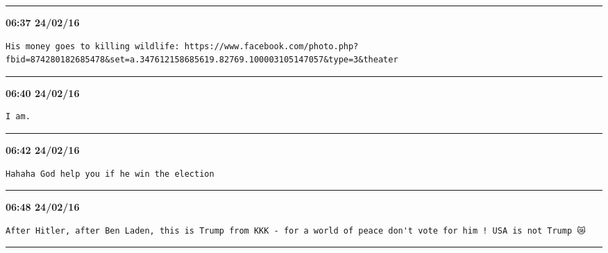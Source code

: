 \hrule%

\begin{adjustwidth}{0cm}{0cm}
\footnotesize \textbf{06:37 24/02/16}

\begin{lstlisting}[breaklines, breakatwhitespace, basicstyle=\small, frame=leftline]
His money goes to killing wildlife: https://www.facebook.com/photo.php?fbid=874280182685478&set=a.347612158685619.82769.100003105147057&type=3&theater
\end{lstlisting}
\end{adjustwidth}

\hrule%

\begin{adjustwidth}{0cm}{0cm}
\footnotesize \textbf{06:40 24/02/16}

\begin{lstlisting}[breaklines, breakatwhitespace, basicstyle=\small, frame=leftline]
I am.
\end{lstlisting}
\end{adjustwidth}

\hrule%

\begin{adjustwidth}{0cm}{0cm}
\footnotesize \textbf{06:42 24/02/16}

\begin{lstlisting}[breaklines, breakatwhitespace, basicstyle=\small, frame=leftline]
Hahaha God help you if he win the election
\end{lstlisting}
\end{adjustwidth}

\hrule%

\begin{adjustwidth}{0cm}{0cm}
\footnotesize \textbf{06:48 24/02/16}

\begin{lstlisting}[breaklines, breakatwhitespace, basicstyle=\small, frame=leftline]
After Hitler, after Ben Laden, this is Trump from KKK - for a world of peace don't vote for him ! USA is not Trump 😿
\end{lstlisting}
\end{adjustwidth}

\hrule%

